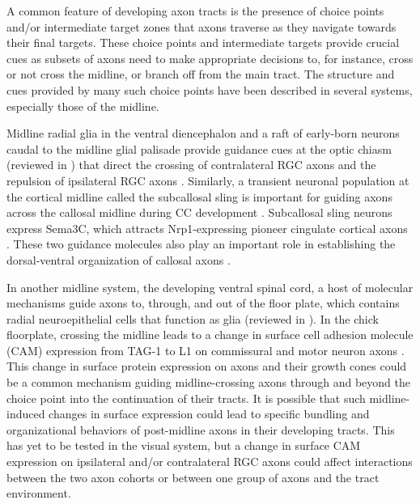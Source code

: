 A common feature of developing axon tracts is the presence of choice points and/or intermediate target zones that axons traverse as they navigate towards their final targets.
These choice points and intermediate targets provide crucial cues as subsets of axons need to make appropriate decisions to, for instance, cross or not cross the midline, or branch off from the main tract.
The structure and cues provided by many such choice points have been described in several systems, especially those of the midline.

Midline radial glia in the ventral diencephalon and a raft of early-born neurons caudal to the midline glial palisade provide guidance cues at the optic chiasm (reviewed in \cite{erskine2014connecting,petros2008retinal}) that direct the crossing of contralateral RGC axons \cite{charron2003morphogen,erskine2011vegf,kuwajima2012optic,williams2006role} and the repulsion of ipsilateral RGC axons \cite{williams2003ephrin,petros2010ephrin,petros2009specificity,}. 
Similarly, a transient neuronal population at the cortical midline called the subcallosal sling is important for guiding axons across the callosal midline during CC development \cite{suarez2014evolution}. 
Subcallosal sling neurons express Sema3C, which attracts Nrp1-expressing pioneer cingulate cortical axons \cite{niquille2009transient,piper2009neuropilin}. 
These two guidance molecules also play an important role in establishing the dorsal-ventral organization of callosal axons \cite{zhou2013axon}. 

In another midline system, the developing ventral spinal cord, a host of molecular mechanisms guide axons to, through, and out of the floor plate, which contains radial neuroepithelial cells that function as glia (reviewed in \cite{neuhaus2015crossing}).
In the chick floorplate, crossing the midline leads to a change in surface cell adhesion molecule (CAM) expression from TAG-1 to L1 on commissural and motor neuron axons \cite{dodd1988spatial}. 
This change in surface protein expression on axons and their growth cones could be a common mechanism guiding midline-crossing axons through and beyond the choice point into the continuation of their tracts. 
It is possible that such midline-induced changes in surface expression could lead to specific bundling and organizational behaviors of post-midline axons in their developing tracts. 
This has yet to be tested in the visual system, but a change in surface CAM expression on ipsilateral and/or contralateral RGC axons could affect interactions between the two axon cohorts or between one group of axons and the tract environment. 

